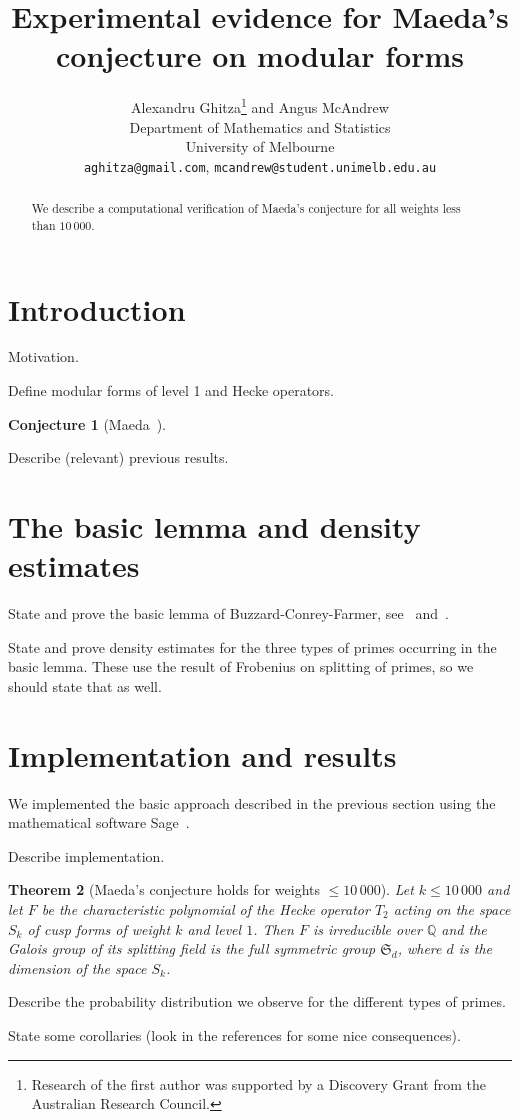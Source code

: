 \documentclass[11pt]{article}
\title{Experimental evidence for Maeda's conjecture on modular forms}
\author{
Alexandru Ghitza\footnote{Research of the first author was supported by 
a Discovery Grant from the Australian Research Council.}  
{} and 
Angus McAndrew\\
Department of Mathematics and Statistics\\
University of Melbourne\\
{\tt aghitza@gmail.com}, {\tt mcandrew@student.unimelb.edu.au}
}
\date{}
\theoremstyle{plain}
\newtheorem{theorem}{Theorem}[section]
\newtheorem{conjecture}[theorem]{Conjecture}
\theoremstyle{definition}
\theoremstyle{remark}
\numberwithin{equation}{section}
\numberwithin{table}{section}
\newcommand{\QQ}{\mathbb Q}
\renewcommand{\SS}{\mathfrak S}
\newcommand{\bound}{10\,000}
\begin{document}
\thispagestyle{empty}

\maketitle
\begin{abstract}
  We describe a computational verification of Maeda's conjecture for
  all weights less than $\bound$.
\end{abstract}


\section{Introduction}

Motivation.

Define modular forms of level 1 and Hecke operators.

\begin{conjecture}[Maeda~\cite{Maeda}]
\end{conjecture}

Describe (relevant) previous results.

\section{The basic lemma and density estimates}

State and prove the basic lemma of Buzzard-Conrey-Farmer,
see~\cite{Buzzard} and~\cite[Lemma~4]{ConreyFarmer}.

State and prove density estimates for the three types of primes
occurring in the basic lemma.  These use the result of Frobenius on
splitting of primes, so we should state that as well.

\section{Implementation and results}
We implemented the basic approach described in the previous section
using the mathematical software Sage~\cite{Sage}.

Describe implementation.

\begin{theorem}[Maeda's conjecture holds for weights $\leq \bound$]
  Let $k\leq \bound$ and let $F$ be the characteristic polynomial of the
  Hecke operator $T_2$ acting on the space $S_k$ of cusp forms of weight
  $k$ and level $1$.  Then $F$ is irreducible over $\QQ$ and the Galois
  group of its splitting field is the full symmetric group $\SS_d$, 
  where $d$ is the dimension of the space $S_k$.
\end{theorem}


Describe the probability distribution we observe for the different types
of primes.

State some corollaries (look in the references for some nice
consequences).


\printbibliography
\end{document}
